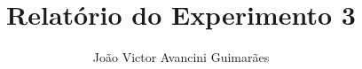 \title{Relat\' orio do Experimento 3}

\newcommand{\disciplina}{Laborat\' orio de Eletricidade Aplicada}

\author{Jo\~ ao Victor Avancini Guimar\~ aes}

\newcommand{\matricula}{12/0122405}

\newcommand{\professor}{Rudi Van Els}

\date{}
